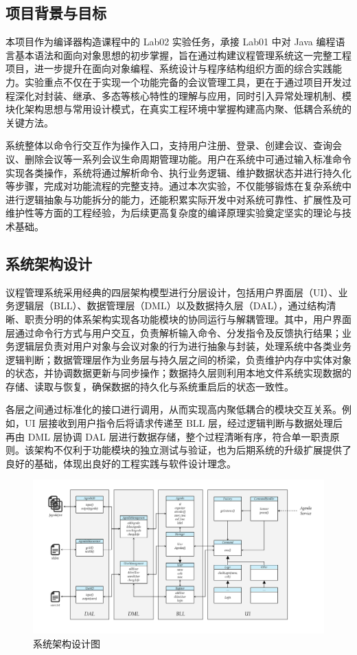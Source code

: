 \documentclass[a4paper, twoside, utf8]{ctexart}
\begin{document}
    \subsection{项目背景与目标}

    本项目作为编译器构造课程中的 Lab02 实验任务，承接 Lab01 中对 Java 编程语言基本语法和面向对象思想的初步掌握，旨在通过构建议程管理系统这一完整工程项目，进一步提升在面向对象编程、系统设计与程序结构组织方面的综合实践能力。实验重点不仅在于实现一个功能完备的会议管理工具，更在于通过项目开发过程深化对封装、继承、多态等核心特性的理解与应用，同时引入异常处理机制、模块化架构思想与常用设计模式，在真实工程环境中掌握构建高内聚、低耦合系统的关键方法。

    系统整体以命令行交互作为操作入口，支持用户注册、登录、创建会议、查询会议、删除会议等一系列会议生命周期管理功能。用户在系统中可通过输入标准命令实现各类操作，系统将通过解析命令、执行业务逻辑、维护数据状态并进行持久化等步骤，完成对功能流程的完整支持。通过本次实验，不仅能够锻炼在复杂系统中进行逻辑抽象与功能拆分的能力，还能积累实际开发中对系统可靠性、扩展性及可维护性等方面的工程经验，为后续更高复杂度的编译原理实验奠定坚实的理论与技术基础。

    \subsection{系统架构设计}

    议程管理系统采用经典的四层架构模型进行分层设计，包括用户界面层（UI）、业务逻辑层（BLL）、数据管理层（DML）以及数据持久层（DAL），通过结构清晰、职责分明的体系架构实现各功能模块的协同运行与解耦管理。其中，用户界面层通过命令行方式与用户交互，负责解析输入命令、分发指令及反馈执行结果；业务逻辑层负责对用户对象与会议对象的行为进行抽象与封装，处理系统中各类业务逻辑判断；数据管理层作为业务层与持久层之间的桥梁，负责维护内存中实体对象的状态，并协调数据更新与同步操作；数据持久层则利用本地文件系统实现数据的存储、读取与恢复，确保数据的持久化与系统重启后的状态一致性。

    各层之间通过标准化的接口进行调用，从而实现高内聚低耦合的模块交互关系。例如，UI 层接收到用户指令后将请求传递至 BLL 层，经过逻辑判断与数据处理后再由 DML 层协调 DAL 层进行数据存储，整个过程清晰有序，符合单一职责原则。该架构不仅利于功能模块的独立测试与验证，也为后期系统的升级扩展提供了良好的基础，体现出良好的工程实践与软件设计理念。

    \begin{figure}
        \centering
        \includegraphics[width=.9\linewidth]{figure/structure.png}
        \caption{系统架构设计图}
    \end{figure}
\end{document}
